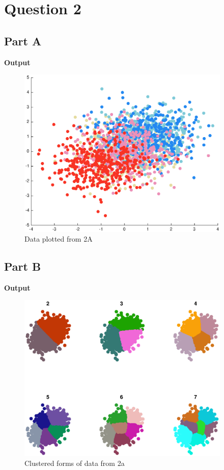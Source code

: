 \documentclass{article}
\begin{document}
\section*{Question 2}
\subsection*{Part A}

\textbf{Output}
\begin{figure}[H]
\centering
\includegraphics[width=4in]{ass2Code/2a.eps}
\caption{Data plotted from 2A}
\end{figure}

\subsection*{Part B}

\textbf{Output}
\begin{figure}[H]
\centering
\includegraphics[width=4in]{ass2Code/2b.eps}
\caption{Clustered forms of data from 2a}
\end{figure}
\pagebreak
\end{document}
